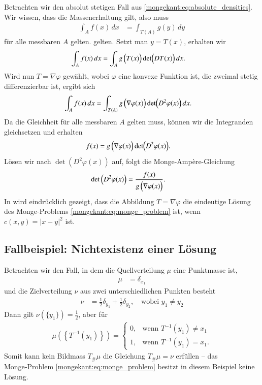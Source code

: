 Betrachten wir den absolut stetigen Fall aus \eqref{mongekant:eq:absolute_densities}.
Wir wissen,
dass die Massenerhaltung gilt,
also muss
\begin{align*}
\int_{A} f(x) \, dx
&=
\int_{T(A)} g(y) \, dy
\end{align*}
für alle messbaren $A$ gelten.
gelten.
Setzt man $y = T(x)$,
erhalten wir
\begin{align*}
\int_{A} f(x) \, dx
&=
\int_{A} g\,\Bigl(T(x)\Bigr) \det\Bigl(DT(x)\Bigr) \, dx
.
\end{align*}
Wird nun $T = \nabla \varphi$ gewählt,
wobei $\varphi$ eine konvexe Funktion ist,
die zweimal stetig differenzierbar ist,
ergibt sich
\begin{align*}
\int_{A} f(x) \, dx
&=
\int_{T(A)} g\,\Bigl(\nabla \varphi(x)\Bigr) \det\Bigl(D^2 \varphi(x)\Bigr) \, dx
.
\end{align*}
Da die Gleichheit für alle messbaren $A$ gelten muss,
können wir die Integranden gleichsetzen und erhalten
\begin{align*}
f(x)
&=
g\,\Bigl(\nabla \varphi(x)\Bigr) \det\Bigl(D^2 \varphi(x)\Bigr)
.
\end{align*}
Lösen wir nach $\det(D^2 \varphi(x))$ auf,
folgt die Monge-Ampère-Gleichung
\begin{align*}
\det\,\Bigl(D^2 \varphi(x)\Bigr)
&=
\frac{f(x)}{g\,\Bigl(\nabla \varphi(x)\Bigr)}
.
\end{align*}
In \cite{mongekant:brenier} wird eindrücklich gezeigt,
dass die Abbildung $T = \nabla \varphi$
die eindeutige Lösung des Monge-Problems \eqref{mongekant:eq:monge_problem} ist,
wenn $c(x,y) = \left\lvert x - y\right\rvert^2$ ist.

\subsection{Fallbeispiel: Nichtexistenz einer Lösung%
\label{mongekant:subsection:monge_inexistence}}
Betrachten wir den Fall,
in dem die Quellverteilung $\mu$ eine Punktmasse ist,
\begin{align*}
\mu
&=
\delta_{x_1}
\end{align*}
und die Zielverteilung $\nu$ aus zwei unterschiedlichen Punkten besteht
\begin{align*}
\nu
&=
\frac{1}{2} \delta_{y_1} + \frac{1}{2} \delta_{y_2}
,\quad
\text{wobei } y_1 \neq y_2
\end{align*}
Dann gilt $\nu(\{y_1\}) = \frac{1}{2}$,
aber für
\begin{align*}
\mu\left(\left\{T^{-1}(y_1)\right\}\right)
=
\begin{cases}
0,
&\text{wenn }
T^{-1}(y_1)
\neq
x_1
\\
1,
&\text{wenn }
T^{-1}(y_1)
=
x_1
.
\end{cases}
\end{align*}
Somit kann kein Bildmass $T_{\#}\mu$ die Gleichung $T_{\#}\mu=\nu$ erfüllen --
das Monge‑Problem \eqref{mongekant:eq:monge_problem} besitzt in diesem Beispiel keine Lösung.



